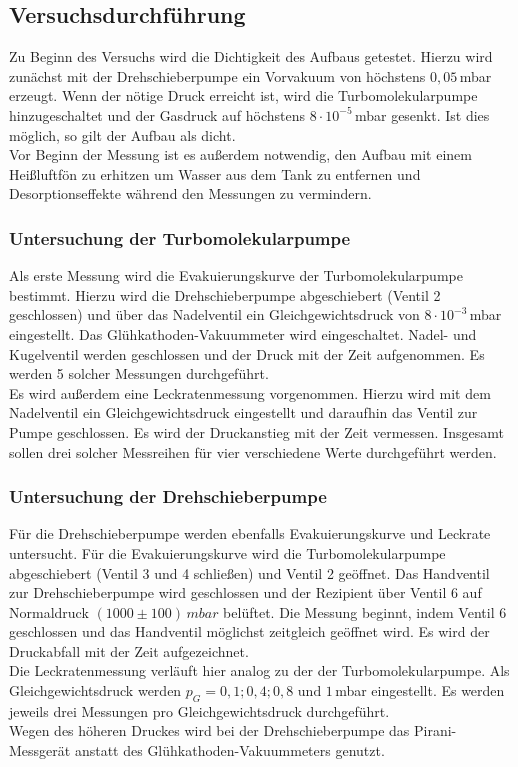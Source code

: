 \subsection{Versuchsdurchführung}
Zu Beginn des Versuchs wird die Dichtigkeit des Aufbaus getestet. Hierzu wird zunächst mit der Drehschieberpumpe ein Vorvakuum von höchstens $0,05$\,\si{\milli\bar} erzeugt. Wenn der nötige Druck erreicht
ist, wird die Turbomolekularpumpe hinzugeschaltet und der Gasdruck auf höchstens $8 \cdot 10^{-5}$\,\si{\milli\bar} gesenkt. Ist dies möglich, so gilt der Aufbau als dicht.\\
Vor Beginn der Messung ist es außerdem notwendig, den Aufbau mit einem Heißluftfön zu erhitzen um Wasser aus dem Tank zu entfernen und Desorptionseffekte während den Messungen zu vermindern.
\subsubsection{Untersuchung der Turbomolekularpumpe}
Als erste Messung wird die Evakuierungskurve der Turbomolekularpumpe bestimmt. Hierzu wird die Drehschieberpumpe abgeschiebert (Ventil 2 geschlossen) und über das Nadelventil ein Gleichgewichtsdruck von
$8 \cdot 10^{-3}$\,\si{\milli\bar} eingestellt. Das Glühkathoden-Vakuummeter wird eingeschaltet. Nadel- und Kugelventil werden geschlossen und der Druck mit der Zeit aufgenommen. Es werden 5 solcher Messungen
durchgeführt.\\
Es wird außerdem eine Leckratenmessung vorgenommen. Hierzu wird mit dem Nadelventil ein Gleichgewichtsdruck eingestellt und daraufhin das Ventil zur Pumpe geschlossen. Es wird
der Druckanstieg mit der Zeit vermessen. Insgesamt sollen drei solcher Messreihen für vier verschiedene Werte durchgeführt werden.
\subsubsection{Untersuchung der Drehschieberpumpe}
Für die Drehschieberpumpe werden ebenfalls Evakuierungskurve und Leckrate untersucht. Für die Evakuierungskurve wird die Turbomolekularpumpe abgeschiebert (Ventil 3 und 4 schließen) und Ventil 2 geöffnet.
Das Handventil zur Drehschieberpumpe wird geschlossen und der Rezipient über Ventil 6 auf Normaldruck $(1000 \pm 100)\,  \si{mbar}$ belüftet. Die Messung beginnt, indem Ventil 6 geschlossen und das Handventil
möglichst zeitgleich geöffnet wird. Es wird der Druckabfall mit der Zeit aufgezeichnet.\\
Die Leckratenmessung verläuft hier analog zu der der Turbomolekularpumpe. Als Gleichgewichtsdruck werden  $p_G=0,1;0,4;0,8 \text{ und } 1 $\,\si{\milli\bar} eingestellt. Es werden jeweils drei Messungen
pro Gleichgewichtsdruck durchgeführt.\\
Wegen des höheren Druckes wird bei der Drehschieberpumpe das Pirani-Messgerät anstatt des Glühkathoden-Vakuummeters genutzt.
\newpage

